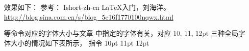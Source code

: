 效果如下：
参考： Ishort-zh-cn LaTeX入门，刘海洋。
\url{http://blog.sina.com.cn/s/blog_5e16f1770100nqwx.html}













 等命令对应的字体大小与文章  中指定的字体有关，对应
10, 11, 12pt 三种全局字体大小的情况如下表所示， 指令 10pt 11pt 12pt


